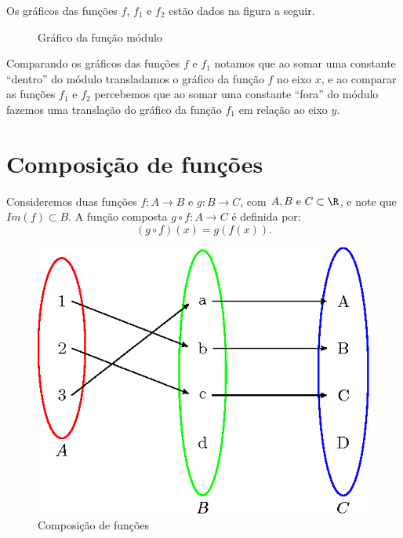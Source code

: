 Os gráficos das funções $f$, $f_1$ e $f_2$ estão dados na figura a seguir.

  \begin{figure}[H]
 \centering
    \caption{Gráfico da função módulo}
  \end{figure}

  Comparando os gráficos das funções $f$ e $f_1$ notamos que ao somar uma constante ``dentro'' do módulo transladamos o gráfico da função $f$ no eixo $x$, e ao comparar as funções $f_1$ e $f_2$ percebemos que ao somar uma constante ``fora'' do módulo fazemos uma translação do gráfico da função $f_1$ em relação ao eixo $y$.
  
\section{Composição de funções}

\begin{defi}
Consideremos duas funções $f: A \rightarrow B$ e $g: B \rightarrow C$, com $A, B \text{ e } C \subset \R$, e note que $Im(f) \subset B$. A função composta $g \circ f: A \rightarrow C$ é definida por:
\begin{equation}
(g \circ f)(x)= g(f(x)). 
\end{equation}

 \begin{figure}[H]
 \centering
 \includegraphics{cap_funcao/figs/tikz/figura_cap_funcao_8}
\caption{Composição de funções}
\end{figure}

\end{defi}

